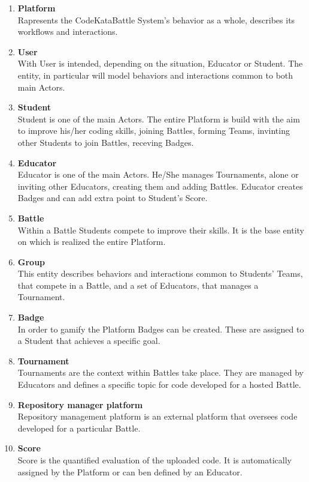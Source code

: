 \begin{enumerate}[label=$\bullet$]
    \item \textbf{Platform}\\Rapresents the CodeKataBattle System's behavior as a whole, describes its workflows and interactions.
    \item \textbf{User}\\With User is intended, depending on the situation, Educator or Student. The entity, in particular will model behaviors and interactions common to both main Actors.
    \item \textbf{Student}\\Student is one of the main Actors. The entire Platform is build with the aim to improve his/her coding skills, joining Battles, forming Teams, invinting other Students to join Battles, receving Badges.
    \item \textbf{Educator}\\Educator is one of the main Actors. He/She manages Tournaments, alone or inviting other Educators, creating them and adding Battles. Educator creates Badges and can add extra point to Student's Score.
    \item \textbf{Battle}\\Within a Battle Students compete to improve their skills. It is the base entity on which is realized the entire Platform.
    \item \textbf{Group}\\This entity describes behaviors and interactions common to Students' Teams, that compete in a Battle, and a set of Educators, that manages a Tournament.
    \item \textbf{Badge}\\In order to gamify the Platform Badges can be created. These are assigned to a Student that achieves a specific goal.
    \item \textbf{Tournament}\\Tournaments are the context within Battles take place. They are managed by Educators and defines a specific topic for code developed for a hosted Battle.
    \item \textbf{Repository manager platform}\\Repository management platform is an external platform that oversees code developed for a particular Battle.
    \item \textbf{Score}\\Score is the quantified evaluation of the uploaded code. It is automatically assigned by the Platform or can ben defined by an Educator.
\end{enumerate}
